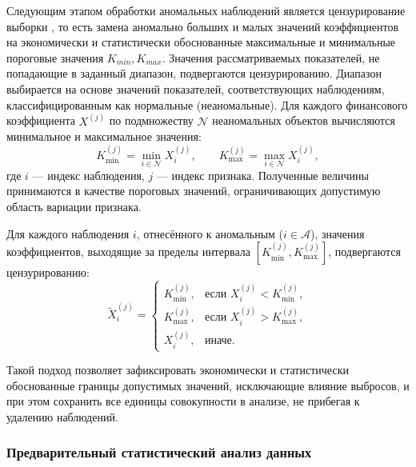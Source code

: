 \documentclass[14pt,a4paper]{extarticle}
\begin{document}
Следующим этапом обработки аномальных наблюдений является цензурирование выборки \cite{23}, то есть 
замена аномально больших и малых значений коэффициентов на экономически и статистически
обоснованные максимальные и минимальные пороговые значения $K_{min}, K_{max}$. Значения рассматриваемых 
показателей, не попадающие в заданный диапазон, подвергаются цензурированию. Диапазон выбирается на основе 
значений показателей, соответствующих наблюдениям, классифицированным как нормальные (неаномальные). Для 
каждого финансового коэффициента $X^{(j)}$ по подмножеству $\mathcal{N}$ неаномальных объектов вычисляются 
минимальное и максимальное значения:
\[
K_{\min}^{(j)} = \min_{i \in \mathcal{N}} X_i^{(j)}, \qquad 
K_{\max}^{(j)} = \max_{i \in \mathcal{N}} X_i^{(j)},
\]
где $i$ — индекс наблюдения, $j$ — индекс признака. Полученные величины принимаются в качестве пороговых 
значений, ограничивающих допустимую область вариации признака.

Для каждого наблюдения $i$, отнесённого к аномальным ($i \in \mathcal{A}$), значения коэффициентов, 
выходящие за пределы интервала $[K_{\min}^{(j)}, K_{\max}^{(j)}]$, подвергаются цензурированию:
\[
\tilde{X}_i^{(j)} = 
\begin{cases}
K_{\min}^{(j)}, & \text{если } X_i^{(j)} < K_{\min}^{(j)}, \\[4pt]
K_{\max}^{(j)}, & \text{если } X_i^{(j)} > K_{\max}^{(j)}, \\[4pt]
X_i^{(j)}, & \text{иначе}.
\end{cases}
\]

Такой подход \cite{23} позволяет зафиксировать экономически и статистически обоснованные границы 
допустимых значений, исключающие влияние выбросов, и при этом сохранить все единицы совокупности в анализе, 
не прибегая к удалению наблюдений.

\subsubsection{Предварительный статистический анализ данных}
\end{document}
